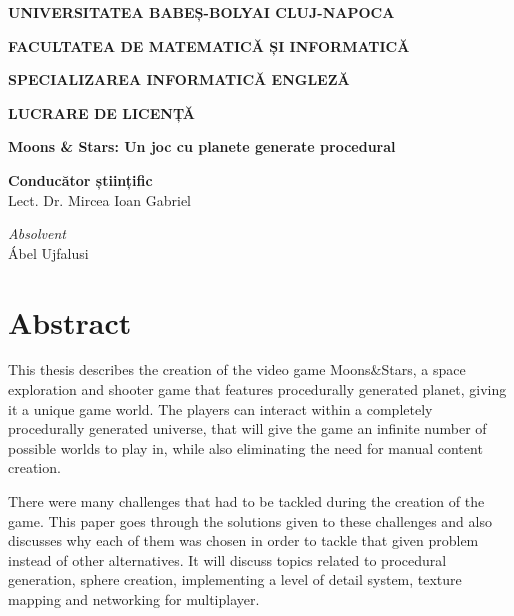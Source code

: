 \documentclass[12pt]{report}
\begin{document}
\begin{titlepage}
    \centering

    {\large \textbf{UNIVERSITATEA BABEȘ-BOLYAI CLUJ-NAPOCA}\par}
    {\large \textbf{FACULTATEA DE MATEMATICĂ ȘI INFORMATICĂ}\par}
    {\large \textbf{SPECIALIZAREA INFORMATICĂ ENGLEZĂ}\par}

    \vspace{4cm}

    {\Huge \textbf{LUCRARE DE LICENȚĂ}\par}

    \vspace{2cm}

    {\LARGE \textbf{Moons \& Stars: Un joc cu planete generate procedural}\par}

    \vfill

    \begin{flushleft}
        \large \textbf{Conducător științific}\\
        Lect. Dr. Mircea Ioan Gabriel
    \end{flushleft}

    \vspace{1cm}

    \begin{flushright}
        \large \textit{Absolvent}\\
        Ábel Ujfalusi
    \end{flushright}

\end{titlepage}
\newpage

\thispagestyle{empty}
\mbox{}
\newpage

\chapter*{Abstract}

This thesis describes the creation of the video game Moons\&Stars, a space exploration and shooter game that features procedurally generated planet, giving it a unique game world. The players can interact within a completely procedurally generated universe, that will give the game an infinite number of possible worlds to play in, while also eliminating the need for manual content creation.

There were many challenges that had to be tackled during the creation of the game. This paper goes through the solutions given to these challenges and also discusses why each of them was chosen in order to tackle that given problem instead of other alternatives. It will discuss topics related to procedural generation, sphere creation, implementing a level of detail system, texture mapping and networking for multiplayer.
\end{document}
